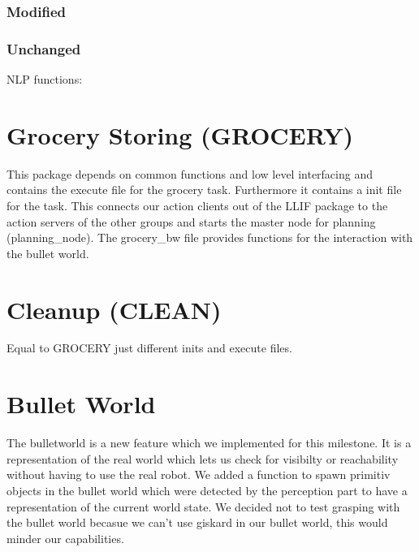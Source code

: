 \documentclass[main.tex]{subfiles}
\begin{document}
                \subsubsection{Modified}
                \subsubsection{Unchanged}NLP functions:
                
                \section{Grocery Storing (GROCERY)}
                This package depends on common functions and low level interfacing and contains the execute file for the grocery task. Furthermore it contains a init file for the task. This connects our action clients out of the LLIF package to the action servers of the other groups and starts the master node for planning (planning\_node). The grocery\_bw file provides functions for the interaction with the bullet world.   
                \section{Cleanup (CLEAN)}
                Equal to GROCERY just different inits and execute files.
                \section{Bullet World}
                The bulletworld is a new feature which we implemented for this milestone. It is a representation of the real world which lets us check for visibilty or reachability without having to use the real robot. We added a function to spawn primitiv objects in the bullet world which were detected by the perception part to have a representation of the current world state. We decided not to test grasping with the bullet world becasue we can't use giskard in our bullet world, this would minder our capabilities.
                
\end{document}
